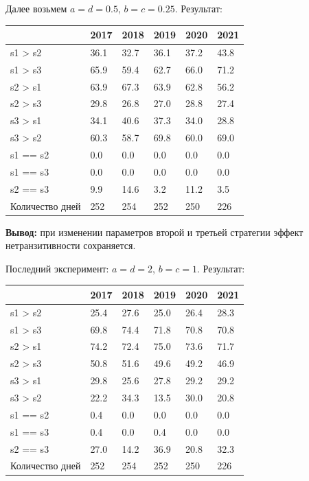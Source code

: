 Далее возьмем $a = d = 0.5$, $b = c = 0.25$. Результат:
 \begin{table}[!ht]
    \centering
    \begin{tabular}{|l|l|l|l|l|l|}
    \hline
         & 2017 & 2018 & 2019 & 2020 & 2021 \\ \hline
        s1 > s2 & 36.1 & 32.7 & 36.1 & 37.2 & 43.8 \\ \hline
        \rowcolor{blue}s1 > s3 & 65.9 & 59.4 & 62.7 & 66.0 & 71.2 \\ \hline
        \rowcolor{blue}s2 > s1 & 63.9 & 67.3 & 63.9 & 62.8 & 56.2 \\ \hline
        s2 > s3 & 29.8 & 26.8 & 27.0 & 28.8 & 27.4 \\ \hline
        s3 > s1 & 34.1 & 40.6 & 37.3 & 34.0 & 28.8 \\ \hline
        \rowcolor{blue}s3 > s2 & 60.3 & 58.7 & 69.8 & 60.0 & 69.0 \\ \hline
        s1 == s2 & 0.0 & 0.0 & 0.0 & 0.0 & 0.0 \\ \hline
        s1 == s3 & 0.0 & 0.0 & 0.0 & 0.0 & 0.0 \\ \hline
        s2 == s3 & 9.9 & 14.6 & 3.2 & 11.2 & 3.5 \\ \hline
        Количество дней & 252 & 254 & 252 & 250 & 226 \\ \hline
    \end{tabular}
\end{table}

\textbf{Вывод:} при изменении параметров второй и третьей стратегии эффект нетранзитивности сохраняется.

\newpage
Последний эксперимент: $a = d = 2$, $b = c = 1$. Результат:

\begin{table}[!ht]
    \centering
    \begin{tabular}{|l|l|l|l|l|l|}
    \hline
         & 2017 & 2018 & 2019 & 2020 & 2021 \\ \hline
        s1 > s2 & 25.4 & 27.6 & 25.0 & 26.4 & 28.3 \\ \hline
        \rowcolor{blue}s1 > s3 & 69.8 & 74.4 & 71.8 & 70.8 & 70.8 \\ \hline
        \rowcolor{blue}s2 > s1 & 74.2 & 72.4 & 75.0 & 73.6 & 71.7 \\ \hline
        \rowcolor{blue}s2 > s3 & 50.8 & 51.6 & 49.6 & 49.2 & 46.9 \\ \hline
        s3 > s1 & 29.8 & 25.6 & 27.8 & 29.2 & 29.2 \\ \hline
        s3 > s2 & 22.2 & 34.3 & 13.5 & 30.0 & 20.8 \\ \hline
        s1 == s2 & 0.4 & 0.0 & 0.0 & 0.0 & 0.0 \\ \hline
        s1 == s3 & 0.4 & 0.0 & 0.4 & 0.0 & 0.0 \\ \hline
        s2 == s3 & 27.0 & 14.2 & 36.9 & 20.8 & 32.3 \\ \hline
        Количество дней & 252 & 254 & 252 & 250 & 226 \\ \hline
    \end{tabular}
\end{table}

